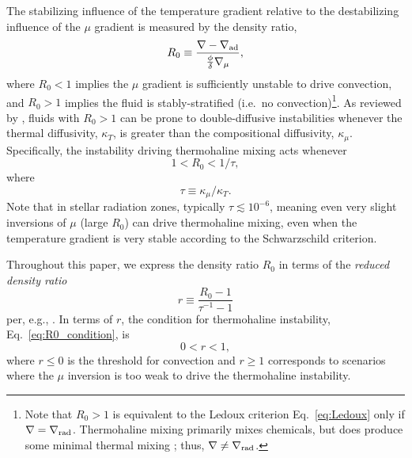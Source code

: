 The stabilizing influence of the temperature gradient relative to the destabilizing influence of the $\mu$ gradient is measured by the density ratio,
\begin{equation} \label{eq:R0}
    R_0 \equiv \frac{\grad - \gradad}{\frac{\phi}{\delta} \gradmu},
\end{equation}
where $R_0 < 1$ implies the $\mu$ gradient is sufficiently unstable to drive convection, and $R_0 > 1$ implies the fluid is stably-stratified (i.e.~no convection)\footnote{Note that $R_0>1$ is equivalent to the Ledoux criterion Eq.~\eqref{eq:Ledoux} only if $\nabla = \nabla_{\rm{rad}}$. Thermohaline mixing primarily mixes chemicals, but does produce some minimal thermal mixing \citep[see, e.g., Fig.~4 of][]{brown_etal_2013}; thus, $\nabla \neq \nabla_{\rm{rad}}$.}. 
As reviewed by \citet{garaud_DDC_review_2018}, fluids with $R_0 > 1$ can be prone to double-diffusive instabilities whenever the thermal diffusivity, $\kappa_T$, is greater than the compositional diffusivity, $\kappa_\mu$. Specifically, the instability driving thermohaline mixing acts whenever
\begin{equation} \label{eq:R0_condition}
1 < R_0 < 1/\tau,
\end{equation}
\citep{baines_gill_1969} where
\begin{equation} \label{eq:tau}
    \tau \equiv \kappa_\mu/\kappa_T.
\end{equation}
Note that in stellar radiation zones, typically $\tau \lesssim 10^{-6}$, meaning even very slight inversions of $\mu$ (large $R_0$) can drive thermohaline mixing, even when the temperature gradient is very stable according to the Schwarzschild criterion.

Throughout this paper, we express the density ratio $R_0$ in terms of the \textit{reduced density ratio}
\begin{equation} \label{eq:r}
    r \equiv \frac{R_0 - 1}{\tau^{-1} - 1}
\end{equation}
per, e.g., \citet{traxler_etal_2011,brown_etal_2013}.
In terms of $r$, the condition for thermohaline instability, Eq.~\eqref{eq:R0_condition}, is
\begin{equation} \label{eq:r_condition}
    0 < r < 1,
\end{equation}
where $r \leq 0$ is the threshold for convection and $r \geq 1$ corresponds to scenarios where the $\mu$ inversion is too weak to drive the thermohaline instability.